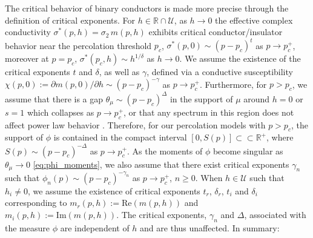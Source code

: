 \documentclass[english,12pt,jmp,graphicx]{revtex4-1}
\begin{document}
The critical behavior of binary conductors is made more precise
through the definition of critical exponents. For
$h\in\mathbb{R}\cap\mathcal{U}$, as $h\to0$ the effective complex conductivity
$\sigma^*(p,h)=\sigma_2\,m(p,h)$ exhibits critical conductor/insulator behavior
near the percolation threshold $p_c$, $\sigma^*(p,0)\sim(p-p_c)^t$ as
$p\to p_c^+$, moreover at $p=p_c$,
$\sigma^*(p_c,h)\sim h^{1/\delta}$ as $h\to0$. We assume the existence of the
critical exponents $t$ and $\delta$, as well as $\gamma$, defined via a
conductive susceptibility $\chi(p,0):=\partial m(p,0)/\partial h\sim(p-p_c)^{-\gamma}$ as
$p\to p_c^+$. Furthermore, for $p>p_c$, we assume that there is a gap 
$\theta_\mu\sim(p-p_c)^\Delta$ in the support of $\mu$ around $h=0$ or $s=1$ which
collapses as $p\to p_c^+$, or that any spectrum in this region does not
affect power law behavior \cite{Golden:PRL-3935}. Therefore, for our
percolation models with $p>p_c$, the support of $\phi$ is contained in
the compact interval $[0,S(p)]\subset\subset\mathbb{R}^+$, where $S(p)\sim(p-p_c)^{-\Delta}$ as
$p\to p_c^+$. As the moments of $\phi$ become singular as $\theta_\mu\to0$ 
\eqref{eq:phi_moments}, we also assume that there exist critical
exponents $\gamma_n$ such that $\phi_n(p)\sim(p-p_c)^{-\gamma_n}$ as $p\to p_c^+$,
$n\geq0$. When $h\in\mathcal{U}$ such that $h_i\neq0$, we
assume the existence of critical exponents $t_r$, $\delta_r$, $t_i$ and
$\delta_i$ corresponding to $m_r(p,h):=\text{Re}(m(p,h))$ and
$m_i(p,h):=\text{Im}(m(p,h))$. The critical exponents, $\gamma_n$ and $\Delta$,
associated with the measure $\phi$ are independent of $h$ and are thus
unaffected. In summary:  
\end{document}
